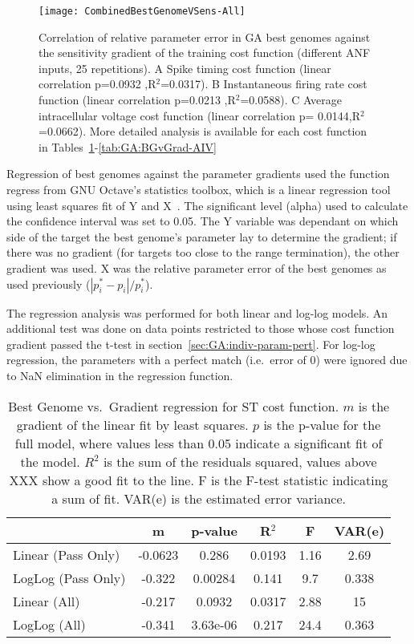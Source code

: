 \begin{figure}[th]
  \centering
  \texttt{[image: CombinedBestGenomeVSens-All]}  
  \caption{Correlation of relative parameter error in {GA} best genomes
    against the sensitivity gradient of the training cost function
    (different {ANF} inputs, 25 repetitions). A Spike timing cost
    function (linear correlation p=0.0932 ,R$^2$=0.0317). B
    Instantaneous firing rate cost function (linear correlation
    p=0.0213 ,R$^2$=0.0588).  C Average intracellular voltage cost
    function (linear correlation p= 0.0144,R$^2$=0.0662).  More
    detailed analysis is available for each cost function in
    Tables~\ref{tab:GA:BGvGrad-ST}-\ref{tab:GA:BGvGrad-AIV}}
  \label{fig:GA:BestGenomeVGradient}
\end{figure}
% 

Regression of best genomes against the parameter gradients used the
function \textsf{regress} from GNU Octave's \textsf{statistics}
toolbox, which is a linear regression tool using least squares fit of
Y and X~\citep{Eaton:2002}. The significant level (alpha) used to
calculate the confidence interval was set to 0.05. The Y variable was
dependant on which side of the target the best genome's parameter lay
to determine the gradient; if there was no gradient (for targets too
close to the range termination), the other gradient was used. X was
the relative parameter error of the best genomes as used previously
($\left|p^\ast_i-{p}_i\right|/p^\ast_i$).

\smallskip{}

The regression analysis was performed for both linear and log-log
models. An additional test was done on data points restricted to those
whose cost function gradient passed the t-test in
section~\ref{sec:GA:indiv-param-pert}. For log-log regression, the
parameters with a perfect match (i.e.\ error of 0) were ignored due to
NaN elimination in the regression function.

\smallskip{}

\begin{table}[th]
  \centering
  \begin{tabular}{lccccc}
\toprule
                   &    m    & p-value  & R$^2$ &  F  & VAR(e) \\[1ex] \midrule
Linear (Pass Only) & -0.0623 &  0.286   & 0.0193& 1.16& 2.69   \\
LogLog (Pass Only) & -0.322  & 0.00284  & 0.141 & 9.7 & 0.338 \\[0.5ex] \hline
   Linear (All)    & -0.217  &  0.0932  & 0.0317& 2.88& 15     \\
   LogLog (All)    & -0.341  & 3.63e-06 & 0.217 & 24.4& 0.363 \\[1ex] \hline    
 \end{tabular}
 \caption{Best Genome vs.\ Gradient regression for ST cost function. $m$ is the gradient of the linear fit by least squares. $p$ is the p-value for the full model, where values  less than 0.05 indicate a significant fit of the model. $R^2$ is the sum of the residuals  squared, values above XXX show a good fit to the line.  F is the F-test statistic  indicating a sum of fit. VAR(e) is the estimated error variance.  }
  \label{tab:GA:BGvGrad-ST}
\end{table}


